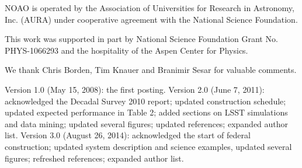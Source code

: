 \documentclass{emulateapj}
\begin{document}
NOAO is operated by the Association of Universities for Research in Astronomy,
Inc. (AURA) under cooperative agreement with the National Science Foundation.

This work was supported in part by National Science Foundation Grant No. PHYS-1066293
and the hospitality of the Aspen Center for Physics.

We thank Chris Borden, Tim Knauer and Branimir Sesar for valuable comments.



\vskip 0.06in
Version 1.0 (May 15, 2008): the first posting.
\vskip 0.06in
Version 2.0 (June 7, 2011): acknowledged the Decadal Survey 2010 report; updated construction schedule;
updated expected performance in Table 2; added sections on LSST simulations and data mining;
updated several figures; updated references; expanded author list.
\vskip 0.06in
Version 3.0 (August 26, 2014): acknowledged the start of federal construction;
updated system description and science examples, updated several figures; refreshed references;
expanded author list.
\end{document}
